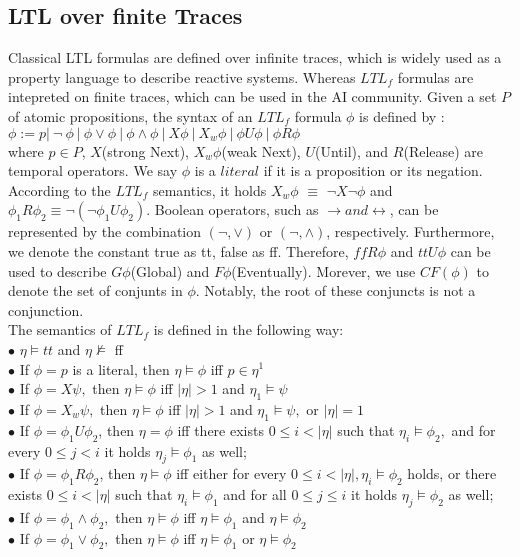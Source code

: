 \subsection{LTL over finite Traces}
\noindent
Classical LTL formulas are defined over infinite traces, which is widely used as a property language to describe reactive systems. Whereas $LTL_f$ formulas are intepreted on finite traces, which can be used in the AI community. Given a set $P$ of atomic propositions, the syntax of an $LTL_f$ formula $\phi$ is defined by :  \\
$\phi:=p |\ \neg\ \phi\ |\ \phi \vee \phi\ |\ \phi \wedge \phi\ |\ X \phi\ |\ X_{w} \phi\ |\ \phi U \phi\ |\ \phi R \phi$ \\
where $p \in P$, $X$(strong Next), $X_{w} \phi$(weak Next), $U$(Until), and $R$(Release) are temporal operators. We say $\phi$ is a $literal$ if it is a proposition or its negation. \\
According to the $LTL_f$ semantics, it holds $X_{w} \phi$ $\equiv$ $\neg X \neg \phi$ and $ \phi_1 R \phi_2 \equiv \neg(\neg \phi_1 U \phi_2 )$. Boolean operators, such as $ \rightarrow and  \leftrightarrow $, can be represented by the combination $(\neg, \vee)$ or $(\neg, \wedge)$, respectively. Furthermore, we denote the constant true as tt, false as ff. Therefore, $ff R \phi$ and $tt U \phi$ can be used to describe $G\phi$(Global) and $F\phi$(Eventually). Morever, we use $CF(\phi)$ to denote the set of conjunts in $\phi$. Notably, the root of these conjuncts is not a conjunction. \\
The semantics of $LTL_f$ is defined in the following way: \\
$\bullet$ $\eta \models tt$ and $\eta \not \models $ ff\\
$\bullet$ If $\phi=p$ is a literal, then $\eta \models \phi$ iff $p \in \eta^{1}$\\
$\bullet$ If $\phi=X \psi,$ then $\eta \models \phi$ iff $|\eta|>1$ and $\eta_{1} \models \psi$\\
$\bullet$ If $\phi=X_{w} \psi,$ then $\eta \models \phi$ iff $|\eta|>1$ and $\eta_{1} \models \psi,$ or $|\eta|=1$\\
$\bullet$ If $\phi=\phi_{1} U \phi_{2}$, then $\eta=\phi$ iff there exists $0 \leq i<|\eta|$ such that $\eta_{i} \models \phi_{2},$ and for every $0 \leq j<i$ it holds $\eta_{j} \models \phi_{1}$ as well;\\
$\bullet$ If $\phi=\phi_{1} R \phi_{2}$, then $\eta \models \phi$ iff either for every $0 \leq i<|\eta|, \eta_{i}\models \phi_{2}$ holds, or there exists $0 \leq i<|\eta|$ such that $\eta_{i} \models \phi_{1}$ and for all $0 \leq j \leq i$ it holds $\eta_{j} \models \phi_{2}$ as well;\\
$\bullet$ If $\phi=\phi_{1} \wedge \phi_{2},$ then $\eta \models \phi$ iff $\eta \models \phi_{1}$ and $\eta \models \phi_{2}$ \\
$\bullet$ If $\phi=\phi_{1} \vee \phi_{2},$ then $\eta \models \phi$ iff $\eta \models \phi_{1}$ or $\eta \models \phi_{2}$ 